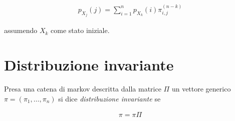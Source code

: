 \documentclass{article}
\begin{document}
\begin{align*}
p_{X_j}(j) = \sum_{i=1}^n p_{X_k}(i) \pi_{i,j}^{(n-k)}
\end{align*}

assumendo $X_k$ come stato iniziale.

\section{Distribuzione invariante}

Presa una catena di markov descritta dalla matrice $\Pi$ un vettore generico $\pi = (\pi_1, \ldots, \pi_n)$ si dice \emph{distribuzione invariante} se

\begin{align*}
\pi = \pi \Pi
\end{align*}
\end{document}
